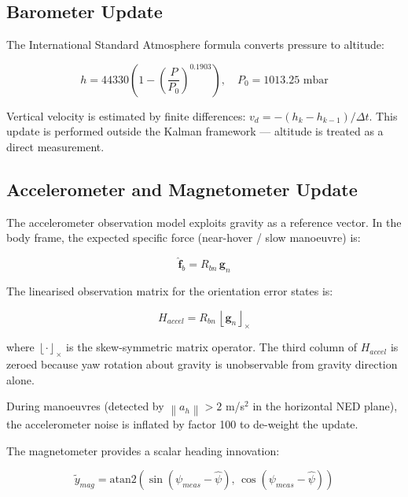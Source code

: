 \documentclass[12pt,a4paper]{article}
\newcommand{\norm}[1]{\left\lVert#1\right\rVert}
\newcommand{\skew}[1]{\left\lfloor#1\right\rfloor_\times}
\begin{document}
\subsection{Barometer Update}

The International Standard Atmosphere formula converts pressure to altitude:

\begin{equation}
    h = 44330 \left( 1 - \left(\frac{P}{P_0}\right)^{0.1903} \right), \quad
    P_0 = 1013.25 \text{ mbar}
    \label{eq:baro}
\end{equation}

Vertical velocity is estimated by finite differences:
$v_d = -(h_k - h_{k-1}) / \Delta t$. This update is performed outside the
Kalman framework --- altitude is treated as a direct measurement.

\subsection{Accelerometer and Magnetometer Update}

The accelerometer observation model exploits gravity as a reference vector.
In the body frame, the expected specific force (near-hover / slow manoeuvre)
is:

\begin{equation}
    \hat{\mathbf{f}}_b = R_{bn}\,\mathbf{g}_n
    \label{eq:accel_model}
\end{equation}

The linearised observation matrix for the orientation error states is:

\begin{equation}
    H_{accel} = R_{bn}\,\skew{\mathbf{g}_n}
    \label{eq:H_accel}
\end{equation}

where $\skew{\cdot}$ is the skew-symmetric matrix operator. The third column
of $H_{accel}$ is zeroed because yaw rotation about gravity is unobservable
from gravity direction alone.

During manoeuvres (detected by $\norm{a_h} > 2$ m/s$^2$ in the horizontal NED
plane), the accelerometer noise is inflated by factor 100 to de-weight the
update.

The magnetometer provides a scalar heading innovation:

\begin{equation}
    \tilde{y}_{mag} = \text{atan2}\!\left(\sin(\psi_{meas} - \hat{\psi}),\,
    \cos(\psi_{meas} - \hat{\psi})\right)
    \label{eq:heading_innov}
\end{equation}
\end{document}
